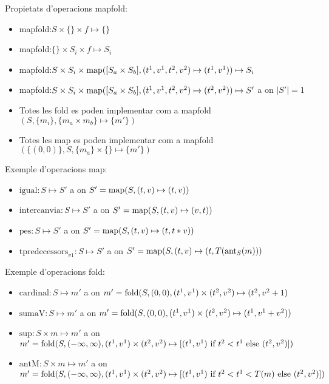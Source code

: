 Propietats d'operacions mapfold:
\begin{itemize}
\item mapfold:$S \times \{\} \times f \mapsto \{\}$ 

\item mapfold:$\{\} \times S_i \times f \mapsto S_i$ 

\item mapfold:$S \times S_i \times
  \operatorname*{map}([S_a\times S_b],(t^1,v^1,t^2,v^2)\mapsto(t^1,v^1)) \mapsto S_i$

\item mapfold:$S \times S_i \times \operatorname*{map}([S_a\times
  S_b],(t^1,v^1,t^2,v^2)\mapsto(t^2,v^2)) \mapsto S'$ a on $|S'|=1$

\item Totes les fold es poden implementar com a mapfold$(S,\{m_i\},
  \{m_a \times m_b\} \mapsto \{m'\})$

\item Totes les map es poden implementar com a mapfold$(\{(0,0)\},S,
  \{m_a\} \times  \{\} \mapsto \{m'\})$
\end{itemize}



Exemple d'operacions map:
\begin{itemize}
\item $\text{igual}: S \mapsto S'$ a on $S'= \operatorname*{map}(S,(t,v)\mapsto(t,v))$
\item $\text{intercanvia}: S \mapsto S'$ a on $S'= \operatorname*{map}(S,(t,v)\mapsto(v,t))$
\item $\text{pes}: S \mapsto S'$ a on $S'= \operatorname*{map}(S,(t,v)\mapsto(t,t*v))$
\item $\text{tpredecessors}_{v1}: S \mapsto S'$ a on $S'= \operatorname*{map}(S,(t,v)
  \mapsto (t,T(\operatorname*{ant}_S(m)))$
\end{itemize}

Exemple d'operacions fold:
\begin{itemize}
\item $\text{cardinal}: S \mapsto m'$ a on $m'=
  \operatorname*{fold}(S,(0,0),(t^1,v^1)\times(t^2,v^2)\mapsto(t^2,v^2+1)$
\item $\text{sumaV}: S \mapsto m'$ a on $m'=
  \operatorname*{fold}(S,(0,0),(t^1,v^1)\times(t^2,v^2)\mapsto(t^1,v^1+v^2))$
\item $\text{sup}: S \times m \mapsto m'$ a on $m'=
  \operatorname*{fold}(S,(-\infty,\infty),(t^1,v^1)\times(t^2,v^2)\mapsto [(t^1,v^1)
  \text{ if } t^2 < t^1 \text{ else } (t^2,v^2) ])$
\item $\text{antM}: S \times m \mapsto m'$ a on $m'=
  \operatorname*{fold}(S,(-\infty,\infty),(t^1,v^1)\times(t^2,v^2)\mapsto [(t^1,v^1)
  \text{ if } t^2 < t^1 < T(m) \text{ else } (t^2,v^2) ])$
\end{itemize}


